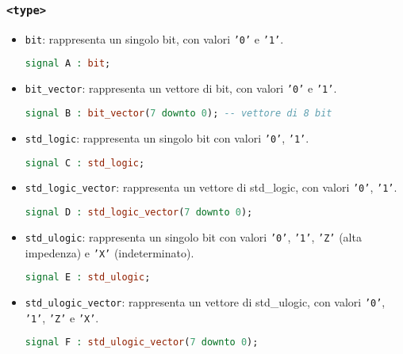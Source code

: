         \subsubsection{\texttt{<type>}}
        \begin{itemize}
        \setlength\itemsep{0pt}
            \item \texttt{bit}: rappresenta un singolo bit, con valori \texttt{'0'} e \texttt{'1'}.
            \begin{lstlisting}[language=VHDL]
                signal A : bit;
            \end{lstlisting}
            \item \texttt{bit\_vector}: rappresenta un vettore di bit, con valori \texttt{'0'} e \texttt{'1'}.
            \begin{lstlisting}[language=VHDL]
                signal B : bit_vector(7 downto 0); -- vettore di 8 bit
            \end{lstlisting}
            \item \texttt{std\_logic}: rappresenta un singolo bit con valori \texttt{'0'}, \texttt{'1'}.
            \begin{lstlisting}[language=VHDL]
                signal C : std_logic;
            \end{lstlisting}
            \item \texttt{std\_logic\_vector}: rappresenta un vettore di std\_logic, con valori \texttt{'0'}, \texttt{'1'}.
            \begin{lstlisting}[language=VHDL]
                signal D : std_logic_vector(7 downto 0);
            \end{lstlisting}
            \item \texttt{std\_ulogic}: rappresenta un singolo bit con valori \texttt{'0'}, \texttt{'1'}, \texttt{'Z'} (alta impedenza) e \texttt{'X'} (indeterminato).
            \begin{lstlisting}[language=VHDL]
                signal E : std_ulogic;
            \end{lstlisting}
            \item \texttt{std\_ulogic\_vector}: rappresenta un vettore di std\_ulogic, con valori \texttt{'0'}, \texttt{'1'}, \texttt{'Z'} e \texttt{'X'}.
            \begin{lstlisting}[language=VHDL]
                signal F : std_ulogic_vector(7 downto 0);
            \end{lstlisting}

\end{itemize}
